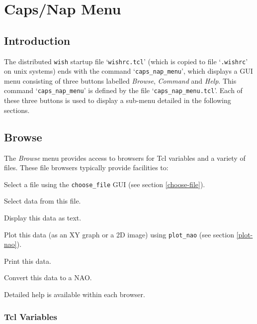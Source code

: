 
\section{Caps/Nap Menu}
    \label{caps-nap-menu}

\subsection{Introduction}
\label{caps-nap-menu-Introduction}

The distributed 
  \texttt{wish} startup file `\texttt{wishrc.tcl}'
    (which is copied to file `\texttt{.wishrc}' on unix systems)
    ends with the command
  `\texttt{caps\_nap\_menu}', which displays a GUI menu
  consisting of three buttons labelled 
  \emph{Browse}, 
  \emph{Command} and 
  \emph{Help}. This command `\texttt{caps\_nap\_menu}' is defined by the file
    `\texttt{caps\_nap\_menu.tcl}'. Each of these three buttons is
  used to display a sub-menu detailed in the following sections.

\subsection{Browse}
    \label{caps-nap-menu-Browse}

The 
  \emph{Browse} menu provides access to browsers for Tcl variables
  and a variety of files. These file browsers typically provide
  facilities to:
\begin{bullets}
    \item Select a file using the \texttt{choose\_file} GUI
	(see section \ref{choose-file}).
    \item Select data from this file.
    \item Display this data as text.
    \item Plot this data (as an XY graph or a 2D image) using 
    \texttt{plot\_nao} (see section \ref{plot-nao}).
    \item Print this data.
    \item Convert this data to a NAO.
\end{bullets}
Detailed help is available within each browser.

\subsubsection{Tcl Variables} 
\label{caps-nap-menu-Variables}

